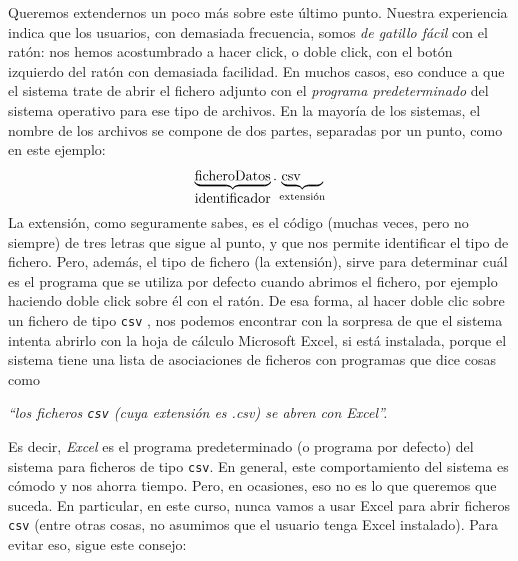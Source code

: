 \documentclass[10pt,a4paper]{article}\usepackage[]{graphicx}\usepackage[]{color}
\newcounter {cont01}
\begin{document}
Queremos extendernos un poco más sobre este último punto. Nuestra experiencia indica que los
usuarios, con demasiada frecuencia, somos {\em de gatillo fácil} con el ratón: nos hemos
acostumbrado a hacer click, o doble click, con el botón izquierdo del ratón con demasiada
facilidad. En muchos casos, eso conduce a que el sistema trate de abrir el fichero adjunto  con el
{\em programa predeterminado} del sistema operativo para ese tipo de archivos. En la mayoría de los
sistemas, el nombre de los archivos se compone de dos partes, separadas por un punto, como en este
ejemplo:
\[
\underbrace{\mbox{ficheroDatos}}_{\mbox{identificador}}.\underbrace{\mbox{csv}\phantom{aaa}}_{\mbox{\scriptsize extensión}}
\]
La {\sf extensión}, como seguramente sabes, es el código (muchas veces, pero no siempre) de tres
letras que sigue al punto, y que nos permite identificar el tipo de fichero. Pero, además, el tipo
de fichero (la extensión), sirve para determinar cuál es el programa que se utiliza por defecto cuando abrimos el fichero, por ejemplo haciendo doble click sobre él con el ratón. De esa forma, al hacer doble clic sobre un fichero de tipo {\tt csv} , nos podemos encontrar con la sorpresa de que el sistema intenta abrirlo con la hoja de cálculo Microsoft Excel, si está instalada, porque el sistema tiene
una lista de asociaciones de ficheros con programas que dice cosas como
\begin{center}
{\em ``los ficheros {\tt csv}  (cuya extensión es {.csv}) se abren con Excel''.}
\end{center}
Es decir, {\em Excel} es el {\sf programa predeterminado} (o programa por defecto) del sistema para
ficheros de tipo {\tt csv}. En general, este comportamiento del sistema es cómodo y nos ahorra
tiempo. Pero, en ocasiones, eso no es lo que queremos que suceda. En particular, en este curso,
nunca vamos a usar Excel para abrir ficheros {\tt csv}  (entre otras cosas, no asumimos que el
usuario tenga Excel instalado). Para evitar eso, sigue este consejo:
        \begin{center}
        \end{center}
\end{document}

